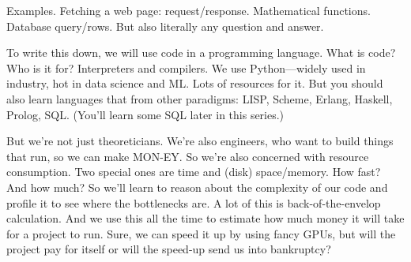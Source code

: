 Examples. Fetching a web page: request/response. Mathematical functions. Database query/rows. But also literally any question and answer.

To write this down, we will use code in a programming language. What is code? Who is it for? Interpreters and compilers. We use Python---widely used in industry, hot in data science and ML. Lots of resources for it. But you should also learn languages that from other paradigms: LISP, Scheme, Erlang, Haskell, Prolog, SQL. (You'll learn some SQL later in this series.)

But we're not just theoreticians. We're also engineers, who want to build things that run, so we can make MON-EY. So we're also concerned with resource consumption. Two special ones are time and (disk) space/memory. How fast? And how much? So we'll learn to reason about the complexity of our code and profile it to see where the bottlenecks are. A lot of this is back-of-the-envelop calculation. And we use this all the time to estimate how much money it will take for a project to run. Sure, we can speed it up by using fancy GPUs, but will the project pay for itself or will the speed-up send us into bankruptcy?

